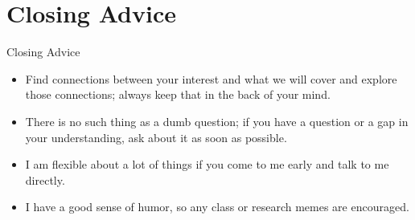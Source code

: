 \documentclass[aspectratio=169]{beamer}
\begin{document}
\section{Closing Advice}

\begin{frame}{Closing Advice}
    \begin{itemize}
        \item Find connections between your interest and what we will cover and explore those connections; always keep that in the back of your mind.
        \item There is no such thing as a dumb question; if you have a question or a gap in your understanding, ask about it as soon as possible.
        \item I am flexible about a lot of things if you come to me early and talk to me directly.
        \item I have a good sense of humor, so any class or research memes are encouraged.

    \end{itemize}
\end{frame}
\end{document}
